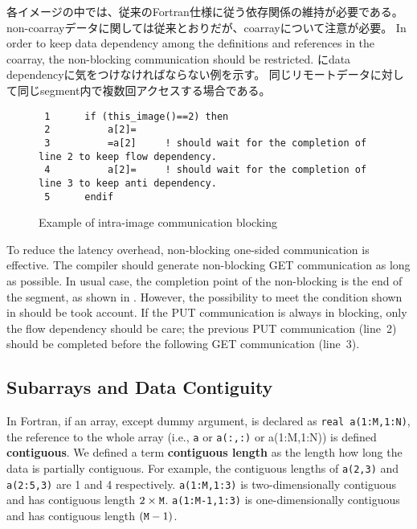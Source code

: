各イメージの中では、従来のFortran仕様に従う依存関係の維持が必要である。
non-coarrayデータに関しては従来とおりだが、coarrayについて注意が必要。
In order to keep data dependency among the definitions and 
references in the coarray, the non-blocking communication should be restricted.
 にdata dependencyに気をつけなければならない例を示す。
同じリモートデータに対して同じsegment内で複数回アクセスする場合である。

\begin{figure}[hbt]
 \begin{center}
\begin{verbatim}
 1      if (this_image()==2) then
 2          a[2]=
 3          =a[2]     ! should wait for the completion of line 2 to keep flow dependency.
 4          a[2]=     ! should wait for the completion of line 3 to keep anti dependency.
 5      endif

\end{verbatim}
  \caption{Example of intra-image communication blocking}
  \label{fig:block-ex}
 \end{center}
\end{figure}


\requirement
To reduce the latency overhead, non-blocking one-sided communication is effective.
The compiler should generate non-blocking GET communication as long as possible.
In usual case, the completion point of the non-blocking is the end of the segment, as
shown in .  However, the possibility to meet the condition shown in
 should be took account. If the PUT communication is always in blocking, 
only the flow dependency should be care; the previous PUT communication (line~2) 
should be completed before the following GET communication (line~3).

\subsection{Subarrays and Data Contiguity}

In Fortran, if an array, except dummy argument, is declared as {\tt real a(1:M,1:N)}, 
the reference to the whole array (i.e., {\tt a} or {\tt a(:,:)} or {a(1:M,1:N)})
is defined {\bf contiguous}. 
We defined a term {\bf contiguous length} as the length how long the data is partially
contiguous. For example, the contiguous lengths of {\tt a(2,3)} and {\tt a(2:5,3)} are
1 and 4 respectively.  {\tt a(1:M,1:3)} is two-dimensionally contiguous and has 
contiguous length $2 \times {\tt M}$.
{\tt a(1:M-1,1:3)} is one-dimensionally contiguous and has 
contiguous length $({\tt M} - 1)$.


